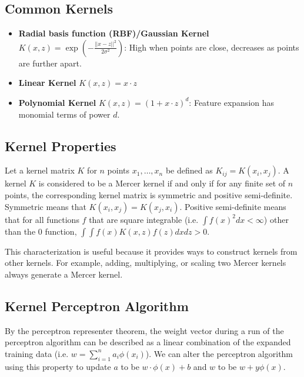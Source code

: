 \documentclass[12pt,titlepage]{article}
\begin{document}
    \subsection{Common Kernels}
      \begin{itemize}
        \item \textbf{Radial basis function (RBF)/Gaussian Kernel} $K(x, z) = \exp(-\frac{||x - z||^2}{2 \sigma^2})$: High when points are close, decreases as points are further apart.
        \item \textbf{Linear Kernel} $K(x, z) = x \cdot z$
        \item \textbf{Polynomial Kernel} $K(x, z) = (1 + x \cdot z)^d$: Feature expansion has monomial terms of power $d$.
      \end{itemize}

    \subsection{Kernel Properties}
      Let a kernel matrix $K$ for $n$ points $x_1, \dots, x_n$ be defined as $K_{ij} = K(x_i, x_j)$. A kernel $K$ is considered to be a Mercer kernel if and only if
      for any finite set of $n$ points, the corresponding kernel matrix is symmetric and positive semi-definite. Symmetric means that $K(x_i, x_j) = K(x_j, x_i)$.
      Positive semi-definite means that for all functions $f$ that are square integrable (i.e. $\int f(x)^2 dx < \infty$) other than the 0 function,
      $\int \int f(x) K(x, z) f(z) dx dz > 0$.

      This characterization is useful because it provides ways to construct kernels from other kernels. For example, adding, multiplying, or scaling two Mercer kernels
      always generate a Mercer kernel.

    \subsection{Kernel Perceptron Algorithm}
      By the perceptron representer theorem, the weight vector during a run of the perceptron algorithm can be described as a linear combination of the expanded training
      data (i.e. $w = \sum_{i=1}^n a_i \phi(x_i)$). We can alter the perceptron algorithm using this property to update $a$ to be $w \cdot \phi(x) + b$ and $w$ to be
      $w + y \phi(x)$.
\end{document}
